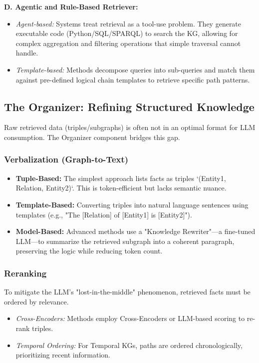 \documentclass[a4paper, 12pt]{extreport}
\begin{document}
\textbf{D. Agentic and Rule-Based Retriever:}
\begin{itemize}
    \item[] \textit{Agent-based:} Systems treat retrieval as a tool-use problem. They generate executable code (Python/SQL/SPARQL) to search the KG, allowing for complex aggregation and filtering operations that simple traversal cannot handle.
    \item[] \textit{Template-based:} Methods decompose queries into sub-queries and match them against pre-defined logical chain templates to retrieve specific path patterns.
\end{itemize}


\subsection{The Organizer: Refining Structured Knowledge}
Raw retrieved data (triples/subgraphs) is often not in an optimal format for LLM consumption. The Organizer component bridges this gap.

\subsubsection{Verbalization (Graph-to-Text)}
\begin{itemize}
    \item[] \textbf{Tuple-Based:} The simplest approach lists facts as triples `(Entity1, Relation, Entity2)`. This is token-efficient but lacks semantic nuance.
    \item[] \textbf{Template-Based:} Converting triples into natural language sentences using templates (e.g., "The [Relation] of [Entity1] is [Entity2]").
    \item[] \textbf{Model-Based:} Advanced methods use a "Knowledge Rewriter"—a fine-tuned LLM—to summarize the retrieved subgraph into a coherent paragraph, preserving the logic while reducing token count.
\end{itemize}

\subsubsection{Reranking}
To mitigate the LLM's "lost-in-the-middle" phenomenon, retrieved facts must be ordered by relevance.
\begin{itemize}
    \item[] \textit{Cross-Encoders:} Methods employ Cross-Encoders or LLM-based scoring to re-rank triples.
    \item[] \textit{Temporal Ordering:} For Temporal KGs, paths are ordered chronologically, prioritizing recent information.
\end{itemize}
\end{document}
